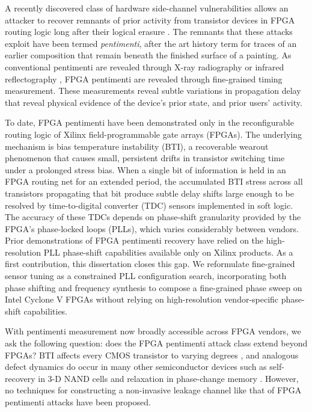 \label{chap:introduction}

A recently discovered class of hardware side-channel vulnerabilities
allows an attacker to recover remnants of prior activity from transistor
devices in FPGA routing logic long after their logical erasure
\cite{drewes2024pentimento}. The remnants that these attacks exploit
have been termed \emph{pentimenti}, after the art history term for
traces of an earlier composition that remain beneath the finished
surface of a painting. As conventional pentimenti are revealed through
X-ray radiography or infrared reflectography \cite{gooch2007visualizing,
	daffara2011multispectral}, FPGA pentimenti are revealed through
fine-grained timing measurement. These measurements reveal subtle
variations in propagation delay that reveal physical evidence of the
device's prior state, and prior users' activity.

To date, FPGA pentimenti have been demonstrated only in the
reconfigurable routing logic of Xilinx field-programmable gate arrays
(FPGAs). The underlying mechanism is bias temperature instability (BTI),
a recoverable wearout phenomenon that causes small, persistent drifts in
transistor switching time under a prolonged stress bias. When a single
bit of information is held in an FPGA routing net for an extended
period, the accumulated BTI stress across all transistors propagating
that bit produce subtle delay shifts large enough to be resolved by
time-to-digital converter (TDC) sensors implemented in soft logic. The
accuracy of these TDCs depends on phase-shift granularity provided by
the FPGA's phase-locked loops (PLLs), which varies considerably between
vendors. Prior demonstrations of FPGA pentimenti recovery have relied on
the high-resolution PLL phase-shift capabilities available only on
Xilinx products. As a first contribution, this dissertation closes this
gap. We reformulate fine-grained sensor tuning as a constrained PLL
configuration search, incorporating both phase shifting and frequency
synthesis to compose a fine-grained phase sweep on Intel Cyclone V FPGAs
without relying on high-resolution vendor-specific phase-shift
capabilities.

With pentimenti measurement now broadly accessible across FPGA vendors,
we ask the following question: does the FPGA pentimenti attack class
extend beyond FPGAs? BTI affects every CMOS transistor to varying
degrees \cite{hill2021cmos}, and analogous defect dynamics do occur in
many other semiconductor devices such as self-recovery in 3-D NAND cells
\cite{luo2018heatwatch} and relaxation in phase-change memory
\cite{le2018collective}. However, no techniques for constructing a
non-invasive leakage channel like that of FPGA pentimenti attacks have
been proposed.

